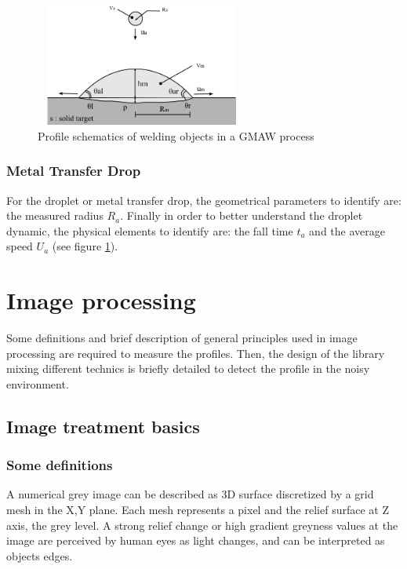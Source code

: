 \documentclass[12pt]{iopart}
\begin{document}
\begin{figure}
\begin{center}
\includegraphics[width=7cm,height=4cm]{images/schema-macro-drop-droplet-parameters.png}
\caption{{\small Profile schematics of welding objects in a GMAW process}}
\label{fig::schema-macro-drop-droplet-parameters}
\end{center}
\end{figure}
    
\subsubsection{ Metal Transfer Drop}
\label{ metam_transfer_drop}

For the droplet or metal transfer drop, the geometrical parameters to identify are:
 the measured radius $R_{a}$. 
Finally in order to better understand the droplet dynamic, 
the physical elements to identify are: the fall time $t_{a}$ and the average 
speed $U_{a}$ (see figure \ref{fig::schema-macro-drop-droplet-parameters}).



\section{Image processing} 
\label{ image_processing}

Some definitions and brief description of general principles used in
 image processing are required to measure the profiles. Then, the design of the library 
mixing different technics
is briefly detailed  to detect the profile in the noisy environment.


\subsection{Image treatment basics}
\subsubsection{Some definitions}
\label{some_definitions}

A numerical grey image can be described as 3D surface discretized by a grid mesh
 in the X,Y plane. Each mesh represents a pixel and the relief surface at Z axis,
 the grey level. 
A strong relief change or high gradient greyness values at
 the image are perceived by human eyes as light changes, and can be interpreted
 as objects edges. 
\end{document}
